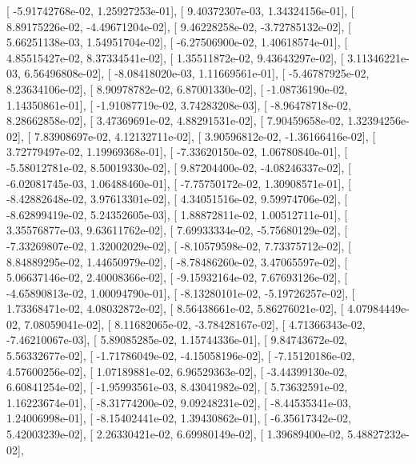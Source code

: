 \documentclass{article}
\begin{document}
       [ -5.91742768e-02,   1.25927253e-01],
       [  9.40372307e-03,   1.34324156e-01],
       [  8.89175226e-02,  -4.49671204e-02],
       [  9.46228258e-02,  -3.72785132e-02],
       [  5.66251138e-03,   1.54951704e-02],
       [ -6.27506900e-02,   1.40618574e-01],
       [  4.85515427e-02,   8.37334541e-02],
       [  1.35511872e-02,   9.43643297e-02],
       [  3.11346221e-03,   6.56496808e-02],
       [ -8.08418020e-03,   1.11669561e-01],
       [ -5.46787925e-02,   8.23634106e-02],
       [  8.90978782e-02,   6.87001330e-02],
       [ -1.08736190e-02,   1.14350861e-01],
       [ -1.91087719e-02,   3.74283208e-03],
       [ -8.96478718e-02,   8.28662858e-02],
       [  3.47369691e-02,   4.88291531e-02],
       [  7.90459658e-02,   1.32394256e-02],
       [  7.83908697e-02,   4.12132711e-02],
       [  3.90596812e-02,  -1.36166416e-02],
       [  3.72779497e-02,   1.19969368e-01],
       [ -7.33620150e-02,   1.06780840e-01],
       [ -5.58012781e-02,   8.50019330e-02],
       [  9.87204400e-02,  -4.08246337e-02],
       [ -6.02081745e-03,   1.06488460e-01],
       [ -7.75750172e-02,   1.30908571e-01],
       [ -8.42882648e-02,   3.97613301e-02],
       [  4.34051516e-02,   9.59974706e-02],
       [ -8.62899419e-02,   5.24352605e-03],
       [  1.88872811e-02,   1.00512711e-01],
       [  3.35576877e-03,   9.63611762e-02],
       [  7.69933334e-02,  -5.75680129e-02],
       [ -7.33269807e-02,   1.32002029e-02],
       [ -8.10579598e-02,   7.73375712e-02],
       [  8.84889295e-02,   1.44650979e-02],
       [ -8.78486260e-02,   3.47065597e-02],
       [  5.06637146e-02,   2.40008366e-02],
       [ -9.15932164e-02,   7.67693126e-02],
       [ -4.65890813e-02,   1.00094790e-01],
       [ -8.13280101e-02,  -5.19726257e-02],
       [  1.73368471e-02,   4.08032872e-02],
       [  8.56438661e-02,   5.86276021e-02],
       [  4.07984449e-02,   7.08059041e-02],
       [  8.11682065e-02,  -3.78428167e-02],
       [  4.71366343e-02,  -7.46210067e-03],
       [  5.89085285e-02,   1.15744336e-01],
       [  9.84743672e-02,   5.56332677e-02],
       [ -1.71786049e-02,  -4.15058196e-02],
       [ -7.15120186e-02,   4.57600256e-02],
       [  1.07189881e-02,   6.96529363e-02],
       [ -3.44399130e-02,   6.60841254e-02],
       [ -1.95993561e-03,   8.43041982e-02],
       [  5.73632591e-02,   1.16223674e-01],
       [ -8.31774200e-02,   9.09248231e-02],
       [ -8.44535341e-03,   1.24006998e-01],
       [ -8.15402441e-02,   1.39430862e-01],
       [ -6.35617342e-02,   5.42003239e-02],
       [  2.26330421e-02,   6.69980149e-02],
       [  1.39689400e-02,   5.48827232e-02],
\end{document}
